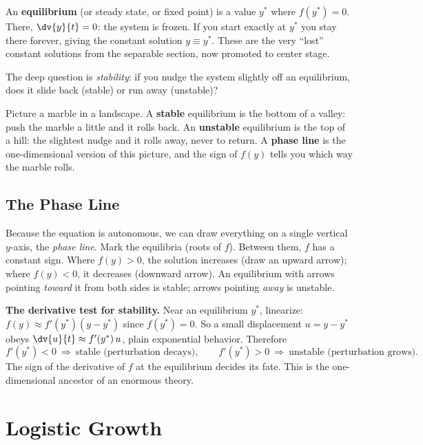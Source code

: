 An \textbf{equilibrium} (or steady state, or fixed point) is a value $y^*$ where
$f(y^*)=0$. There, $\dv{y}{t}=0$: the system is frozen. If you start exactly at
$y^*$ you stay there forever, giving the constant solution $y\equiv y^*$. These are
the very ``lost'' constant solutions from the separable section, now promoted to
center stage.

The deep question is \emph{stability}: if you nudge the system slightly off an
equilibrium, does it slide back (stable) or run away (unstable)?

\begin{intuitionbox}
Picture a marble in a landscape. A \textbf{stable} equilibrium is the bottom of a
valley: push the marble a little and it rolls back. An \textbf{unstable}
equilibrium is the top of a hill: the slightest nudge and it rolls away, never to
return. A \textbf{phase line} is the one-dimensional version of this picture, and
the sign of $f(y)$ tells you which way the marble rolls.
\end{intuitionbox}

\subsection{The Phase Line}

Because the equation is autonomous, we can draw everything on a single vertical
$y$-axis, the \emph{phase line}. Mark the equilibria (roots of $f$). Between them,
$f$ has a constant sign. Where $f(y)>0$, the solution increases (draw an upward
arrow); where $f(y)<0$, it decreases (downward arrow). An equilibrium with arrows
pointing \emph{toward} it from both sides is stable; arrows pointing \emph{away} is
unstable.

\begin{focusbox}
\textbf{The derivative test for stability.} Near an equilibrium $y^*$, linearize:
$f(y)\approx f'(y^*)(y-y^*)$ since $f(y^*)=0$. So a small displacement
$u=y-y^*$ obeys $\dv{u}{t}\approx f'(y^*)\,u$, plain exponential behavior. Therefore
\[
  f'(y^*) < 0 \ \Rightarrow\ \text{stable (perturbation decays)},\qquad
  f'(y^*) > 0 \ \Rightarrow\ \text{unstable (perturbation grows)}.
\]
The sign of the derivative of $f$ at the equilibrium decides its fate. This is the
one-dimensional ancestor of an enormous theory.
\end{focusbox}

\section{Logistic Growth}

